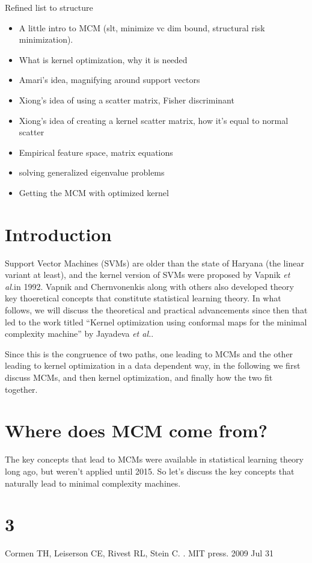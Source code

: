 \documentclass[11pt]{article}
\newcommand{\etal}{{\em et al.}}
\begin{document}
Refined list to structure
    \begin{itemize}
        \item A little intro to MCM (slt, minimize vc dim bound, structural risk minimization).
        \item What is kernel optimization, why it is needed
        \item Amari's idea, magnifying around support vectors
        \item Xiong's idea of using a scatter matrix, Fisher discriminant
        \item Xiong's idea of creating a kernel scatter matrix, how it's equal to normal scatter
        \item Empirical feature space, matrix equations
        \item solving generalized eigenvalue problems
        \item Getting the MCM with optimized kernel
    \end{itemize}


\section{Introduction}
Support Vector Machines (SVMs) are older than the state of Haryana (the linear variant at
least), and the kernel version of SVMs were proposed by Vapnik \etal in 1992. Vapnik and
Chernvonenkis along with others also developed theory key thoeretical concepts that
constitute statistical learning theory. In what follows, we will discuss the theoretical
and practical advancements since then that led to the work titled ``Kernel optimization
using conformal maps for the minimal complexity machine'' by Jayadeva \etal.\par
Since this is the congruence of two paths, one leading to MCMs and the other leading to
kernel optimization in a data dependent way, in the following we first discuss MCMs, and
then kernel optimization, and finally how the two fit together.


\section{Where does MCM come from?}
The key concepts that lead to MCMs were available in statistical learning theory long ago,
but weren't applied until 2015. So let's discuss the key concepts that naturally lead to
minimal complexity machines.
\cite{mr:random}


\section{3}

	
	
	\begin{thebibliography}{10}
	Cormen TH, Leiserson CE, Rivest RL, Stein C. 
		.
		\newblock MIT press.	2009 Jul 31
	\end{thebibliography}
	
	
	
\end{document}
